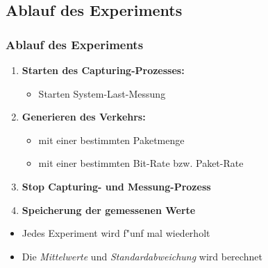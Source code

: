 \documentclass{beamer}
\begin{document}
\subsection*{Ablauf des Experiments}
\begin{frame}
\frametitle{Ablauf des Experiments}
\begin{enumerate}
	\item \textbf{Starten des Capturing-Prozesses:}
		\begin{itemize}
			\item Starten System-Last-Messung
		\end{itemize}
	\item \textbf{Generieren des Verkehrs:}
		\begin{itemize}
			\item mit einer bestimmten Paketmenge
			\item mit einer bestimmten Bit-Rate bzw. Paket-Rate
		\end{itemize}
	\item \textbf{Stop Capturing- und Messung-Prozess}
	\item \textbf{Speicherung der gemessenen Werte}
\end{enumerate}
\begin{itemize}
	\item Jedes Experiment wird f"unf mal wiederholt
	\item Die \emph{Mittelwerte} und \emph{Standardabweichung} wird berechnet
\end{itemize}
\end{frame}
\end{document}
